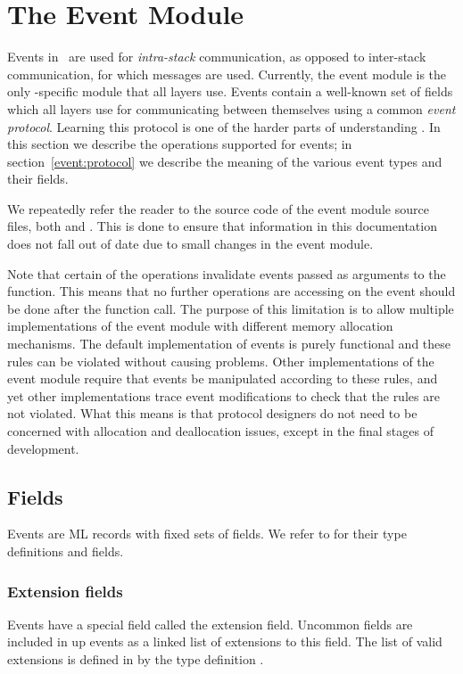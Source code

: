 \section{The Event Module}
\label{event:module}

Events in \ensemble\ are used for \emph{intra-stack} communication, as opposed
to inter-stack communication, for which messages are used.  Currently, the
event module is the only \ensemble-specific module that all layers use.
Events contain a well-known set of fields which all layers use for
communicating between themselves using a common \emph{event protocol}.
Learning this protocol is one of the harder parts of understanding \ensemble.
In this section we describe the operations supported for events; in
section~\ref{event:protocol} we describe the meaning of the various event
types and their fields.

We repeatedly refer the reader to the source code of the event module source
files, both  and .  This is done to
ensure that information in this documentation does not fall out of date due to
small changes in the event module.

Note that certain of the operations invalidate events passed as arguments to
the function.  This means that no further operations are accessing on the event
should be done after the function call.  The purpose of this limitation is to
allow multiple implementations of the event module with different memory
allocation mechanisms.  The default implementation of events is purely
functional and these rules can be violated without causing problems.  Other
implementations of the event module require that events be manipulated
according to these rules, and yet other implementations trace event
modifications to check that the rules are not violated.  What this means is
that protocol designers do not need to be concerned with allocation and
deallocation issues, except in the final stages of development.

\subsection{Fields}
Events are ML records with fixed sets of fields.  We refer to
 for their type definitions and fields.

\subsubsection{Extension fields}
Events have a special field called the extension field.  Uncommon fields are
included in up events as a linked list of extensions to this field.  The list
of valid extensions is defined in  by the type definition
.

